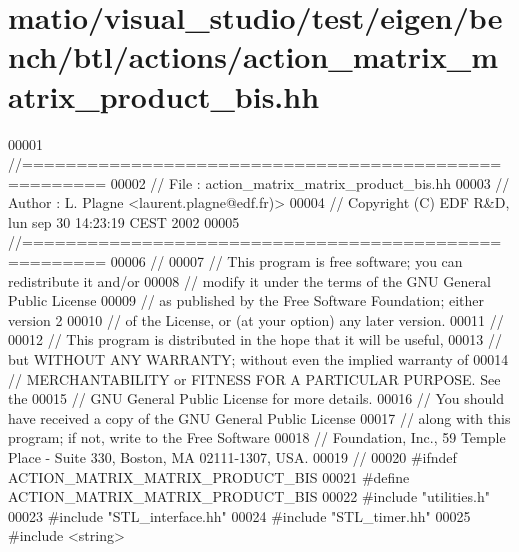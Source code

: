 \hypertarget{matio_2visual__studio_2test_2eigen_2bench_2btl_2actions_2action__matrix__matrix__product__bis_8hh_source}{}\section{matio/visual\+\_\+studio/test/eigen/bench/btl/actions/action\+\_\+matrix\+\_\+matrix\+\_\+product\+\_\+bis.hh}
\label{matio_2visual__studio_2test_2eigen_2bench_2btl_2actions_2action__matrix__matrix__product__bis_8hh_source}

\begin{DoxyCode}
00001 \textcolor{comment}{//=====================================================}
00002 \textcolor{comment}{// File   :  action\_matrix\_matrix\_product\_bis.hh}
00003 \textcolor{comment}{// Author :  L. Plagne <laurent.plagne@edf.fr)>}
00004 \textcolor{comment}{// Copyright (C) EDF R&D,  lun sep 30 14:23:19 CEST 2002}
00005 \textcolor{comment}{//=====================================================}
00006 \textcolor{comment}{//}
00007 \textcolor{comment}{// This program is free software; you can redistribute it and/or}
00008 \textcolor{comment}{// modify it under the terms of the GNU General Public License}
00009 \textcolor{comment}{// as published by the Free Software Foundation; either version 2}
00010 \textcolor{comment}{// of the License, or (at your option) any later version.}
00011 \textcolor{comment}{//}
00012 \textcolor{comment}{// This program is distributed in the hope that it will be useful,}
00013 \textcolor{comment}{// but WITHOUT ANY WARRANTY; without even the implied warranty of}
00014 \textcolor{comment}{// MERCHANTABILITY or FITNESS FOR A PARTICULAR PURPOSE.  See the}
00015 \textcolor{comment}{// GNU General Public License for more details.}
00016 \textcolor{comment}{// You should have received a copy of the GNU General Public License}
00017 \textcolor{comment}{// along with this program; if not, write to the Free Software}
00018 \textcolor{comment}{// Foundation, Inc., 59 Temple Place - Suite 330, Boston, MA  02111-1307, USA.}
00019 \textcolor{comment}{//}
00020 \textcolor{preprocessor}{#ifndef ACTION\_MATRIX\_MATRIX\_PRODUCT\_BIS}
00021 \textcolor{preprocessor}{#define ACTION\_MATRIX\_MATRIX\_PRODUCT\_BIS}
00022 \textcolor{preprocessor}{#include "utilities.h"}
00023 \textcolor{preprocessor}{#include "STL\_interface.hh"}
00024 \textcolor{preprocessor}{#include "STL\_timer.hh"}
00025 \textcolor{preprocessor}{#include <string>}

\end{DoxyCode}
